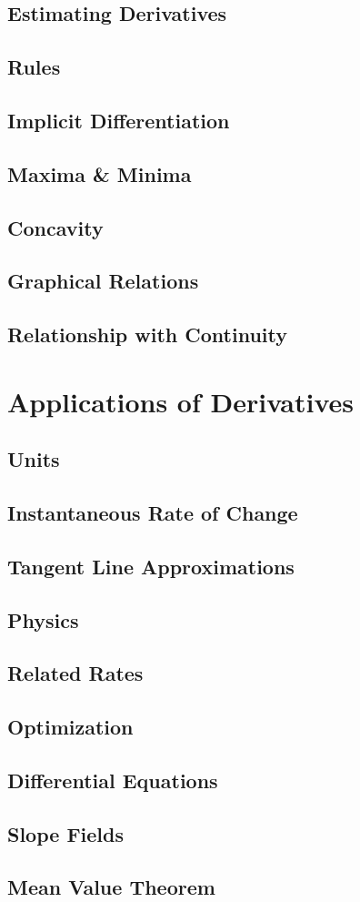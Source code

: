 \documentclass{article}
\begin{document}
\subsection{Estimating Derivatives}
\subsection{Rules}
\subsection{Implicit Differentiation}
\subsection{Maxima \& Minima}
\subsection{Concavity}
\subsection{Graphical Relations}
\subsection{Relationship with Continuity}

\section{Applications of Derivatives}
\subsection{Units}
\subsection{Instantaneous Rate of Change}
\subsection{Tangent Line Approximations}
\subsection{Physics}
\subsection{Related Rates}
\subsection{Optimization}
\subsection{Differential Equations}
\subsection{Slope Fields}
\subsection{Mean Value Theorem}
\end{document}
